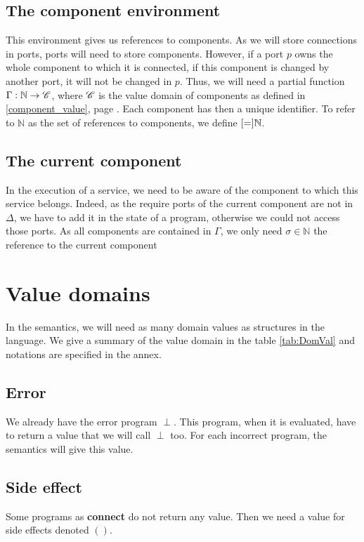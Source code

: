 \subsection{The component environment}
This environment gives us references to components. As we will store connections in ports, ports will need to store components. However, if a port $p$ owns the whole component to which it is connected, if this component is changed by another port, it will not be changed in $p$. Thus, we will need a partial function $\Gamma : \mathbb{N} \rightarrow \mathcal{C}$, where $\mathcal{C}$ is the value domain of components as defined in \ref{component_value}, page \pageref{component_value}. Each component has then a unique identifier. To refer to $\mathbb{N}$ as the set of references to components, we define $\Cref = \mathbb{N}$.

\subsection{The current component}
In the execution of a service, we need to be aware of the component to which this service belongs. Indeed, as the require ports of the current component are not in $\Delta$, we have to add it in the state of a program, otherwise we could not access those ports. As all components are contained in $\Gamma$, we only need $\sigma \in \mathbb{N}$ the reference to the current component






\section{Value domains}
In the semantics, we will need as many domain values as structures in the language. We give a summary of the value domain in the table  \ref{tab:DomVal} and notations are specified in the annex.

\subsection{Error}
We already have the error program $\perp$. This program, when it is evaluated, have to return a value that we will call $\perp$ too. For each incorrect program, the semantics will give this value.

\subsection{Side effect}
Some programs as \textbf{connect} do not return any value. Then we need a value for side effects denoted $()$.

